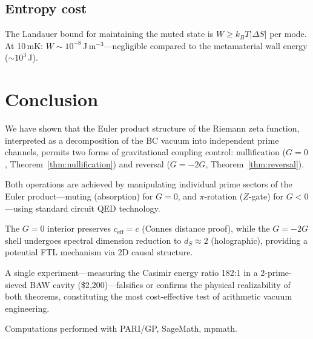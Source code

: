 \documentclass[aps,prd,twocolumn,superscriptaddress,nofootinbib]{revtex4-2}
\begin{document}
\subsection{Entropy cost}

The Landauer bound for maintaining the muted state
is $W \geq k_B T |\Delta S|$ per mode.
At 10\,mK: $W \sim 10^{-8}$\,J\,m$^{-3}$---negligible
compared to the metamaterial wall energy ($\sim 10^3$\,J).

\section{Conclusion}

We have shown that the Euler product structure of the Riemann zeta
function, interpreted as a decomposition of the BC vacuum into
independent prime channels, permits two forms of gravitational coupling
control:
nullification ($G = 0$, Theorem~\ref{thm:nullification})
and reversal ($G = -2G$, Theorem~\ref{thm:reversal}).

Both operations are achieved by manipulating individual prime sectors
of the Euler product---muting (absorption) for $G = 0$,
and $\pi$-rotation ($Z$-gate) for $G < 0$---using standard
circuit QED technology.

The $G = 0$ interior preserves $c_{\mathrm{eff}} = c$ (Connes
distance proof), while the $G = -2G$ shell undergoes spectral
dimension reduction to $d_S \approx 2$ (holographic), providing a
potential FTL mechanism via 2D causal structure.

A single experiment---measuring the Casimir energy ratio 182:1 in
a 2-prime-sieved BAW cavity (\$2{,}200)---falsifies or confirms the
physical realizability of both theorems, constituting the most
cost-effective test of arithmetic vacuum engineering.

\begin{acknowledgments}
Computations performed with PARI/GP, SageMath, mpmath.
\end{acknowledgments}
\end{document}
